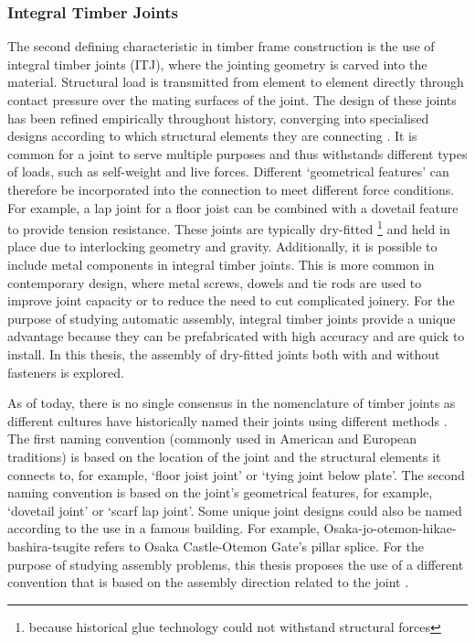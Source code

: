 \subsubsection{Integral Timber Joints}
\label{subsubsection:introduction-integral-timber-joints}

The second defining characteristic in timber frame construction is the use of integral timber joints (ITJ), where the jointing geometry is carved into the material. Structural load is transmitted from element to element directly through contact pressure over the mating surfaces of the joint. The design of these joints has been refined empirically throughout history, converging into specialised designs according to which structural elements they are connecting \autocite{jacksobonHistoricAmericanTimber2014}. It is common for a joint to serve multiple purposes and thus withstands different types of loads, such as self-weight and live forces. Different ‘geometrical features’ can therefore be incorporated into the connection to meet different force conditions. For example, a lap joint for a floor joist can be combined with a dovetail feature to provide tension resistance.
These joints are typically dry-fitted \footnote{because historical glue technology could not withstand structural forces} and held in place due to interlocking geometry and gravity.
Additionally, it is possible to include metal components in integral timber joints.
This is more common in contemporary design, where metal screws, dowels and tie rods are used to improve joint capacity or to reduce the need to cut complicated joinery.
For the purpose of studying automatic assembly, integral timber joints provide a unique advantage because they can be prefabricated with high accuracy  and are quick to install.
In this thesis, the assembly of dry-fitted joints both with and without fasteners is explored.

As of today, there is no single consensus in the nomenclature of timber joints as different cultures have historically named their joints using different methods \parencite{satoCompleteJapaneseJoinery1995,seikeArtJapaneseJoinery1977a,sumiyoshiWoodJointsClassical1991}. The first naming convention (commonly used in American and European traditions) is based on the location of the joint and the structural elements it connects to, for example, ‘floor joist joint’ or ‘tying joint below plate’. The second naming convention is based on the joint's geometrical features, for example, ‘dovetail joint’ or ‘scarf lap joint’. Some unique joint designs could also be named according to the use in a famous building. For example, Osaka-jo-otemon-hikae-bashira-tsugite refers to Osaka Castle-Otemon Gate's pillar splice. For the purpose of studying assembly problems, this thesis proposes the use of a different convention that is based on the assembly direction related to the joint .

